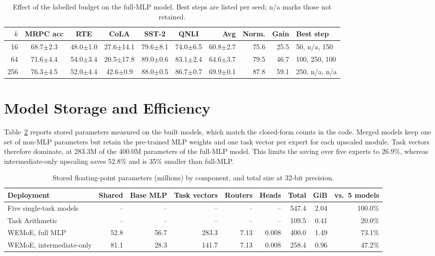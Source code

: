 \begin{table}[htbp]
  \centering\tablestyle
  \caption{Effect of the labelled budget on the full-MLP model. Best steps are listed per seed; n/a marks those not retained.}
  \label{tab:budget}
  \setlength{\tabcolsep}{3pt}\begin{tabular}{r c c c c c r r r l}
    \toprule
    $k$ & MRPC acc & RTE & CoLA & SST-2 & QNLI & Avg & Norm. & Gain & Best step\\
    \midrule
    16 & 68.7$\pm$2.3 & 48.0$\pm$1.0 & 27.6$\pm$14.1 & 79.6$\pm$8.1 & 74.0$\pm$6.5 & 60.8$\pm$2.7 & 75.6 & 25.5 & 50, n/a, 150\\
    64 & 71.6$\pm$4.4 & 54.0$\pm$3.4 & 20.5$\pm$17.8 & 89.0$\pm$0.6 & 83.1$\pm$2.4 & 64.6$\pm$3.7 & 79.5 & 46.7 & 100, 250, 100\\
    256 & 76.3$\pm$4.5 & 52.0$\pm$4.4 & 42.6$\pm$0.9 & 88.0$\pm$0.5 & 86.7$\pm$0.7 & 69.9$\pm$0.1 & 87.8 & 59.1 & 250, n/a, n/a\\
    \bottomrule
  \end{tabular}
\end{table}

\section{Model Storage and Efficiency}

Table~\ref{tab:storage} reports stored parameters measured on the built models, which match the closed-form counts in the code. Merged models keep one set of non-MLP parameters but retain the pre-trained MLP weights and one task vector per expert for each upscaled module. Task vectors therefore dominate, at 283.3M of the 400.0M parameters of the full-MLP model. This limits the saving over five experts to 26.9\%, whereas intermediate-only upscaling saves 52.8\% and is 35\% smaller than full-MLP.

\begin{table}[htbp]
  \centering\tablestyle
  \caption{Stored floating-point parameters (millions) by component, and total size at 32-bit precision.}
  \label{tab:storage}
  \begin{tabular}{l r r r r r r r r}
    \toprule
    Deployment & Shared & Base MLP & Task vectors & Routers & Heads & Total & GiB & vs.\ 5 models\\
    \midrule
    Five single-task models & -- & -- & -- & -- & -- & 547.4 & 2.04 & 100.0\%\\
    Task Arithmetic & -- & -- & -- & -- & -- & 109.5 & 0.41 & 20.0\%\\
    WEMoE, full MLP & 52.8 & 56.7 & 283.3 & 7.13 & 0.008 & 400.0 & 1.49 & 73.1\%\\
    WEMoE, intermediate-only & 81.1 & 28.3 & 141.7 & 7.13 & 0.008 & 258.4 & 0.96 & 47.2\%\\
    \bottomrule
  \end{tabular}
\end{table}

